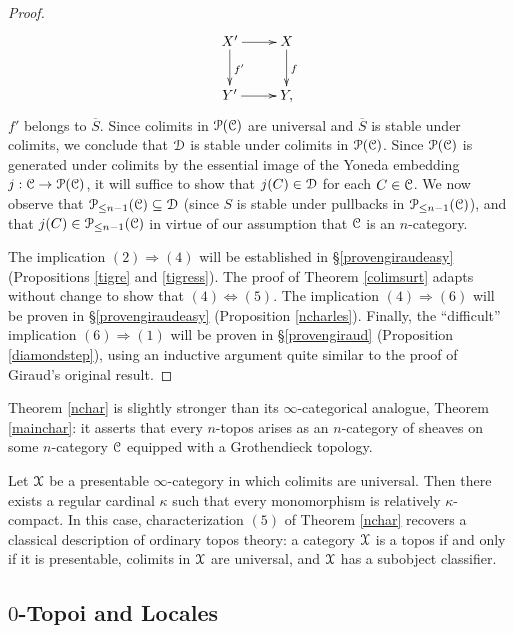 \begin{proof}
$$ \xymatrix{ X' \ar[r] \ar[d]^{f'} & X \ar[d]^{f} \\
Y' \ar[r] & Y, }$$
$f'$ belongs to $\overline{S}$. Since colimits in $\operatorname{\mathcal{P}}(\operatorname{\mathcal{C}})$ are universal and $\overline{S}$ is stable under colimits, we conclude that $\operatorname{\mathcal{D}}$ is stable under colimits in $\operatorname{\mathcal{P}}(\operatorname{\mathcal{C}})$. 
Since $\operatorname{\mathcal{P}}(\operatorname{\mathcal{C}})$ is generated under colimits by the essential image of the Yoneda embedding
$j: \operatorname{\mathcal{C}} \rightarrow \operatorname{\mathcal{P}}(\operatorname{\mathcal{C}})$, it will suffice to show that $j(C) \in \operatorname{\mathcal{D}}$ for each $C \in \operatorname{\mathcal{C}}$.
We now observe that $\operatorname{\mathcal{P}}_{\leq n-1}(\operatorname{\mathcal{C}}) \subseteq \operatorname{\mathcal{D}}$ (since $S$ is stable under pullbacks in $\operatorname{\mathcal{P}}_{\leq n-1}(\operatorname{\mathcal{C}})$), and that $j(C) \in \operatorname{\mathcal{P}}_{\leq n-1}(\operatorname{\mathcal{C}})$ in virtue of our assumption that $\operatorname{\mathcal{C}}$ is an $n$-category.

The implication $(2) \Rightarrow (4)$ will be established in \S \ref{provengiraudeasy} (Propositions \ref{tigre} and \ref{tigress}).
The proof of Theorem \ref{colimsurt} adapts without change to show that $(4) \Leftrightarrow (5)$.
The implication $(4) \Rightarrow (6)$ will be proven in \S \ref{provengiraudeasy} (Proposition \ref{ncharles}). Finally, the ``difficult'' implication $(6) \Rightarrow (1)$ will be proven in \S \ref{provengiraud} (Proposition \ref{diamondstep}), using an inductive argument quite similar to the proof of Giraud's original result.
\end{proof}

\begin{remark}
Theorem \ref{nchar} is slightly stronger than its $\infty$-categorical analogue, Theorem \ref{mainchar}: it asserts that every $n$-topos arises as an $n$-category of sheaves on some
$n$-category $\operatorname{\mathcal{C}}$ equipped with a Grothendieck topology.
\end{remark}

\begin{remark}
Let $\operatorname{\mathcal{X}}$ be a presentable $\infty$-category in which colimits are universal. Then
there exists a regular cardinal $\kappa$ such that every monomorphism is relatively $\kappa$-compact. In this case, characterization $(5)$ of Theorem \ref{nchar} recovers a classical
description of ordinary topos theory: a category $\operatorname{\mathcal{X}}$ is a topos if and only if it is presentable, colimits in $\operatorname{\mathcal{X}}$ are universal, and $\operatorname{\mathcal{X}}$ has a subobject classifier.
\end{remark}

\subsection{$0$-Topoi and Locales}\label{0topoi}

